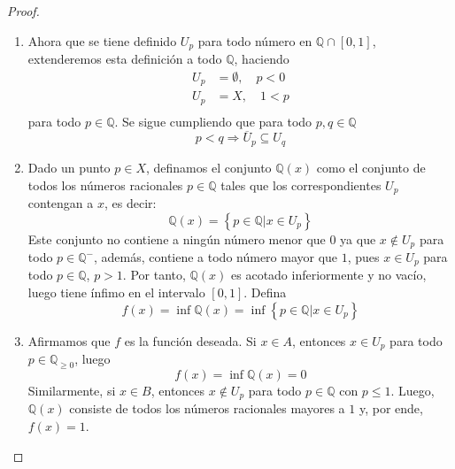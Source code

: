 \documentclass[12pt]{report}
\newcounter{it}
\theoremstyle{largebreak}
\newcommand{\Cls}[1]{\ensuremath{\overline{#1}}}
\begin{document}
\begin{proof}
\begin{enumerate}
            \item Ahora que se tiene definido $U_p$ para todo número en $\mathbb{Q}\cap[0,1]$, extenderemos esta definición a todo $\mathbb{Q}$, haciendo
            \begin{equation*}
                \begin{split}
                    U_p&=\emptyset,\quad p<0\\
                    U_p&=X,\quad 1<p\\
                \end{split}
            \end{equation*}
            para todo $p\in\mathbb{Q}$. Se sigue cumpliendo que para todo $p,q\in\mathbb{Q}$
            \begin{equation*}
                p<q\Rightarrow \Cls{U}_p\subseteq U_q
            \end{equation*}
            \item Dado un punto $p\in X$, definamos el conjunto $\mathbb{Q}(x)$ como el conjunto de todos los números racionales $p\in\mathbb{Q}$ tales que los correspondientes $U_p$ contengan a $x$, es decir:
            \begin{equation*}
                \mathbb{Q}(x)=\left\{p\in\mathbb{Q}\Big|x\in U_p \right\}
            \end{equation*}
            Este conjunto no contiene a ningún número menor que $0$ ya que $x\notin U_p$ para todo $p\in\mathbb{Q}^-$, además, contiene a todo número mayor que $1$, pues $x\in U_p$ para todo $p\in\mathbb{Q}$, $p>1$. Por tanto, $\mathbb{Q}(x)$ es acotado inferiormente y no vacío, luego tiene ínfimo en el intervalo $[0,1]$. Defina
            \begin{equation*}
                f(x)=\inf\mathbb{Q}(x)=\inf\left\{p\in\mathbb{Q} \Big| x\in U_p \right\}
            \end{equation*}
            \item Afirmamos que $f$ es la función deseada. Si $x\in A$, entonces $x\in U_p$ para todo $p\in\mathbb{Q}_{\geq0}$, luego
            \begin{equation*}
                f(x)=\inf\mathbb{Q}(x)=0
            \end{equation*}
            Similarmente, si $x\in B$, entonces $x\notin U_p$ para todo $p\in\mathbb{Q}$ con $p\leq 1$. Luego, $\mathbb{Q}(x)$ consiste de todos los números racionales mayores a $1$ y, por ende, $f(x)=1$.


\end{enumerate}
\end{proof}
\end{document}
